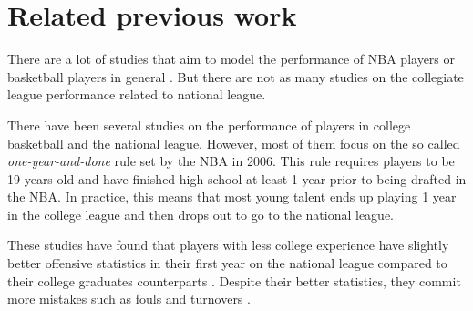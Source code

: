 \section{Related previous work}%
\label{sec:previous-work}

There are a lot of studies that aim to model the performance of NBA players
or basketball players in general \cite{terner_modeling_2020,
casals_modelling_2013, kokanauskas_modelling_2021}.  But there are not as many
studies on the collegiate league performance related to national league.

There have been several studies on the performance of players in college
basketball and the national league. However, most of them focus on the so called
\emph{one-year-and-done} rule \cite{noauthor_nba_2006} set by the NBA in 2006.
This rule requires players to be 19 years old and have finished high-school at least
1 year prior to being drafted in the NBA. In practice, this means that most
young talent ends up playing 1 year in the college league and then drops out to
go to the national league.

These studies have found that players with less college experience have slightly
better offensive statistics in their first year on the national league compared to their
college graduates counterparts \cite{ashley_explaining_2017}. Despite their better statistics,
they commit more mistakes such as fouls and turnovers \cite{zestcott_one_2020}.


